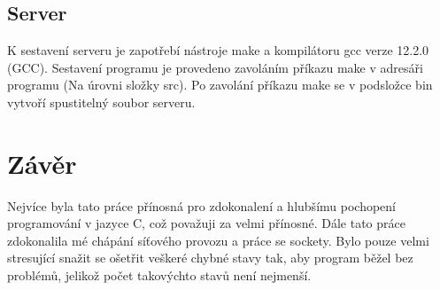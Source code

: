 \documentclass[12pt]{article}
\begin{document}
\subsection{Server}
K sestavení serveru je zapotřebí nástroje make a kompilátoru gcc verze 12.2.0 (GCC). Sestavení programu je provedeno zavoláním příkazu make v adresáři programu (Na úrovni složky src). Po zavolání příkazu make se v podsložce bin vytvoří spustitelný soubor serveru.

\newpage
\section{Závěr}
Nejvíce byla tato práce přínosná pro zdokonalení a hlubšímu pochopení programování v jazyce C, což považuji za velmi přínosné. Dále tato práce zdokonalila mé chápání síťového provozu a práce se sockety. Bylo pouze velmi stresující snažit se ošetřit veškeré chybné stavy tak, aby program běžel bez problémů, jelikož počet takovýchto stavů není nejmenší. 
\end{document}
